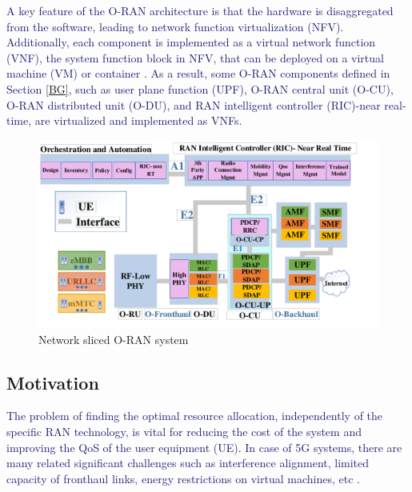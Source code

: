 \documentclass[lettersize,journal]{IEEEtran}
\begin{document}
\textcolor{MidnightBlue}{A key feature of the O-RAN architecture is that the hardware is disaggregated from the software, leading to network function virtualization (NFV). Additionally, each component is implemented as a virtual network function (VNF), the system function block in NFV, that can be deployed on a virtual machine (VM) or container \cite{mijumbi2015network}.}
\textcolor{MidnightBlue}{As a result, some O-RAN components defined in Section \ref{BG}, such as user plane function (UPF), O-RAN central unit (O-CU), O-RAN distributed unit (O-DU), and RAN intelligent controller (RIC)-near real-time, are virtualized and implemented as VNFs.}

\begin{figure}
  \centering
  \captionsetup{justification=centering}
    \includegraphics[scale = 0.36]{finalDraw1.pdf}
  \caption{Network sliced O-RAN system}
  \label{fig:c11}
\end{figure}
\subsection{Motivation}
\textcolor{MidnightBlue}{The problem of finding the optimal resource allocation, independently of the specific RAN technology, is vital for reducing the cost of the system and improving the QoS of the user equipment (UE). In case of 5G systems, there are many related significant challenges such as interference alignment, limited capacity of fronthaul links, energy restrictions on virtual machines, etc \cite{lee2018dynamic,SystemCostMinimization, setayesh2020joint}.} 
\end{document}
